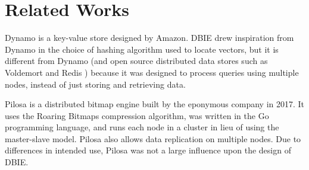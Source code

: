 \section{Related Works}
Dynamo \cite{decandia2007} is a key-value store designed by Amazon. DBIE drew
inspiration from Dynamo in the choice of hashing algorithm used to locate
vectors, but it is different from Dynamo (and open source distributed data
stores such as Voldemort \cite{voldemort} and Redis \cite{redis}) because it
was designed to process queries using multiple nodes, instead of just storing
and retrieving data.
\par
Pilosa \cite{pilosa} is a distributed bitmap engine built by the eponymous
company in 2017. It uses the Roaring Bitmaps \cite{roaring} compression
algorithm, was written in the Go programming language, and runs each node in a
cluster in lieu of using the master-slave model. Pilosa also allows data
replication on multiple nodes. Due to differences in intended use,
Pilosa was not a large influence upon the design of DBIE.
